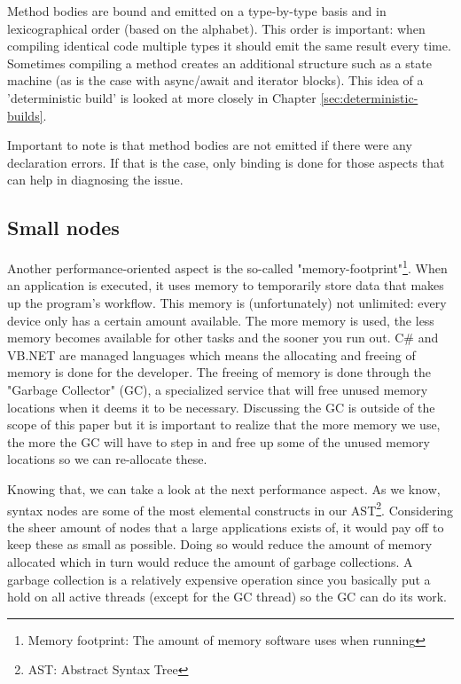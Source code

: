 Method bodies are bound and emitted on a type-by-type basis and in lexicographical order (based on the alphabet). This order is important: when compiling identical code multiple types it should emit the same result every time. Sometimes compiling a method creates an additional structure such as a state machine (as is the case with async/await and iterator blocks). This idea of a 'deterministic build' is looked at more closely in Chapter \ref{sec:deterministic-builds}. 

Important to note is that method bodies are not emitted if there were any declaration errors. If that is the case, only binding is done for those aspects that can help in diagnosing the issue.\parencite{Sadov2014}


\subsection{Small nodes}
\label{sec:small-nodes}

Another performance-oriented aspect is the so-called "memory-footprint"\footnote{Memory footprint: The amount of memory software uses when running}. When an application is executed, it uses memory to temporarily store data that makes up the program's workflow. This memory is (unfortunately) not unlimited: every device only has a certain amount available. The more memory is used, the less memory becomes available for other tasks and the sooner you run out. C\# and VB.NET are managed languages which means the allocating and freeing of memory is done for the developer. The freeing of memory is done through the "Garbage Collector" (GC), a specialized service that will free unused memory locations when it deems it to be necessary. Discussing the GC is outside of the scope of this paper but it is important to realize that the more memory we use, the more the GC will have to step in and free up some of the unused memory locations so we can re-allocate these.\parencite{Todorov2013}

Knowing that, we can take a look at the next performance aspect. As we know, syntax nodes are some of the most elemental constructs in our AST\footnote{AST: Abstract Syntax Tree}. Considering the sheer amount of nodes that a large applications exists of, it would pay off to keep these as small as possible. Doing so would reduce the amount of memory allocated which in turn would reduce the amount of garbage collections. A garbage collection is a relatively expensive operation since you basically put a hold on all active threads (except for the GC thread) so the GC can do its work.\parencite{Botelho2014}

